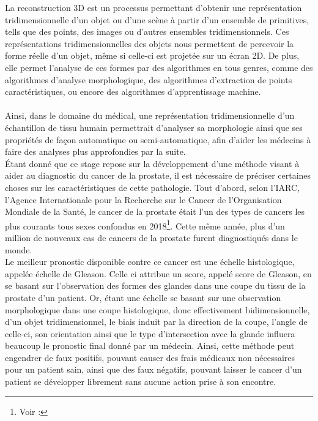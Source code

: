 {	%

	La reconstruction 3D est un processus permettant d'obtenir une représentation tridimensionnelle d'un objet ou d'une scène à partir d'un ensemble de primitives, tells que des points, des images ou d'autres ensembles tridimensionnels. Ces représentations tridimensionnelles des objets nous permettent de percevoir la forme réelle d'un objet, même si celle-ci est projetée sur un écran 2D. De plus, elle permet l'analyse de ces formes par des algorithmes en tous genres, comme des algorithmes d'analyse morphologique, des algorithmes d'extraction de points caractéristiques, ou encore des algorithmes d'apprentissage machine.\\

	\\

	Ainsi, dans le domaine du médical, une représentation tridimensionnelle d'un échantillon de tissu humain permettrait d'analyser sa morphologie ainsi que ses propriétés de façon automatique ou semi-automatique, afin d'aider les médecins à faire des analyses plus approfondies par la suite.\\

	\'Etant donné que ce stage repose sur la développement d'une méthode visant à aider au diagnostic du cancer de la prostate, il est nécessaire de préciser certaines choses sur les caractéristiques de cette pathologie. Tout d'abord, selon l'IARC, l'Agence Internationale pour la Recherche sur le Cancer de l'Organisation Mondiale de la Santé, le cancer de la prostate était l'un des types de cancers les plus courants tous sexes confondus en 2018\footnote{Voir : }. Cette même année, plus d'un million de nouveaux cas de cancers de la prostate furent diagnostiqués dans le monde.\\

	Le meilleur pronostic disponible contre ce cancer est une échelle histologique, appelée échelle de Gleason. Celle ci attribue un score, appelé score de Gleason, en se basant sur l'observation des formes des glandes dans une coupe du tissu de la prostate d'un patient. Or, étant une échelle se basant sur une observation morphologique dans une coupe histologique, donc effectivement bidimensionnelle, d'un objet tridimensionnel, le biais induit par la direction de la coupe, l'angle de celle-ci, son orientation ainsi que le type d'intersection avec la glande influera beaucoup le pronostic final donné par un médecin. Ainsi, cette méthode peut engendrer de faux positifs, pouvant causer des frais médicaux non nécessaires pour un patient sain, ainsi que des faux négatifs, pouvant laisser le cancer d'un patient se développer librement sans aucune action prise à son encontre.\\

}
